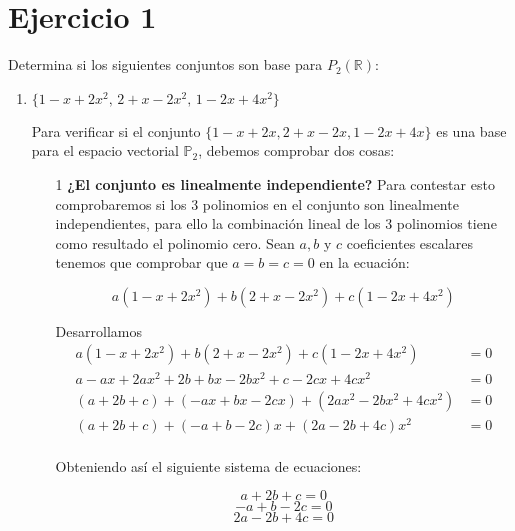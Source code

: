 \section*{Ejercicio 1}

Determina si los siguientes conjuntos son base para $P_2(\mathbb{R})$:

\begin{enumerate}
    \item $\{ 1 - x + 2x^{2},\, 2 + x - 2x^{2},\, 1 - 2x + 4x^{2} \}$
    
    Para verificar si el conjunto $\{1 - x + 2x, 2 + x - 2x, 1 - 2x + 4x\}$ es una base para el espacio vectorial $\mathbb{P}_2$, debemos comprobar dos cosas:
    \begin{enumerate}
        \item[1] \textbf{¿El conjunto es linealmente independiente?} Para contestar esto comprobaremos
        si los 3 polinomios en el conjunto son linealmente independientes, para ello la combinación
        lineal de los 3 polinomios tiene como resultado el polinomio cero. Sean $a, b$ y $c$
        coeficientes escalares tenemos que comprobar que $a = b = c = 0$ en la ecuación:

        $$a(1 - x + 2x^2) + b(2 + x - 2x^2) + c(1 - 2x + 4x^2)$$

        Desarrollamos
        \begin{align*}
            a(1 - x + 2x^2) + b(2 + x - 2x^2) + c(1 - 2x + 4x^2) &= 0 \\
            a - ax + 2ax^2 + 2b + bx - 2bx^2 + c - 2cx + 4cx^2 &= 0 \\
            (a + 2b + c) + (-ax + bx - 2cx) + (2ax^2 - 2bx^2 + 4cx^2) &= 0 \\
            (a + 2b + c) + (-a + b - 2c)x + (2a - 2b + 4c)x^2 &= 0 \\
        \end{align*}
            
        Obteniendo así el siguiente sistema de ecuaciones:

        \begin{equation}
            a + 2b + c = 0                
        \end{equation}
        \begin{equation}
            -a + b -2c = 0
        \end{equation}
        \begin{equation}
            2a - 2b + 4c = 0
        \end{equation}


\end{enumerate}
\end{enumerate}
